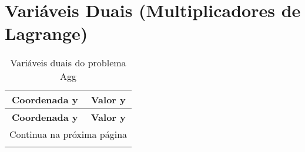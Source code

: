\documentclass[12pt]{article}
\begin{document}
\section{Variáveis Duais (Multiplicadores de Lagrange)}

\begin{longtable}{@{}cc@{}}
\caption{Variáveis duais do problema Agg} \\
\toprule
\textbf{Coordenada y} & \textbf{Valor y} \\
\midrule
\endfirsthead

\toprule
\textbf{Coordenada y} & \textbf{Valor y} \\
\midrule
\endhead

\midrule \multicolumn{2}{r}{{Continua na próxima página}} \\ \midrule
\endfoot


\end{longtable}
\end{document}
